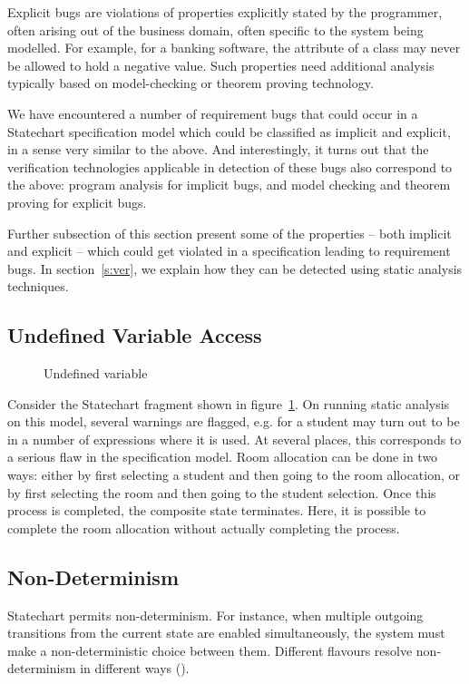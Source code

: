 \documentclass[12pt,a4paper]{report}
\begin{document}
Explicit bugs are violations of properties explicitly stated by the programmer, often arising out of the business domain, often specific to the system being modelled. For example, for a banking software, the \lstinline@balance@ attribute of a \lstinline@BankAccount@ class may never be allowed to hold a negative value. Such properties need additional analysis typically based on model-checking or theorem proving technology. 

We have encountered a number of requirement bugs that could occur in a Statechart specification model which could be classified as implicit and explicit, in a sense very similar to the above. And interestingly, it turns out that the verification technologies applicable in detection of these bugs also correspond to the above: program analysis for implicit bugs, and model checking and theorem proving for explicit bugs.

Further subsection of this section present some of the properties -- both implicit and explicit -- which could get violated in a specification leading to requirement bugs.  In section~\ref{s:ver}, we explain how they can be detected using static analysis techniques.

\subsection{Undefined Variable Access}
\begin{figure}
\caption{Undefined variable}
\label{f:undefined}
\end{figure}

Consider the Statechart fragment shown in figure~\ref{f:undefined}. On running static analysis on this model, several warnings are flagged, e.g. \lstinline@roomNumber@ for a student may turn out to be \lstinline@nil@ in a number of expressions where it is used. At several places, this corresponds to a serious flaw in the specification model. Room allocation can be done in two ways: either by first selecting a student and then going to the room allocation, or by first selecting the room and then going to the student selection. Once this process is completed, the composite state \lstinline@AllocateRoom@ terminates. Here, it is possible to complete the room allocation without actually completing the process. 

\subsection{Non-Determinism}
Statechart permits non-determinism. For instance, when multiple outgoing transitions from the current state are enabled simultaneously, the system must make a non-deterministic choice between them. Different flavours resolve non-determinism in different ways ().
\end{document}
